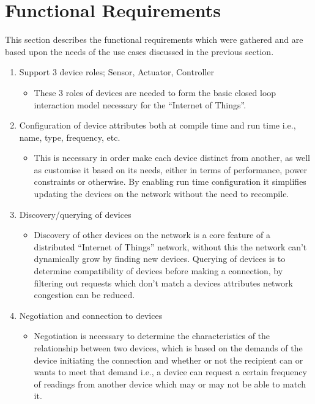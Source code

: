 \section{Functional Requirements} %
\label{sec:functional_requirements}
This section describes the functional requirements which were gathered and are based upon the needs of the use cases discussed in the previous section.
\begin{enumerate}
	\item Support 3 device roles; Sensor, Actuator, Controller
	\begin{itemize}
		\item These 3 roles of devices are needed to form the basic closed loop interaction model necessary for the ``Internet of Things''.
	\end{itemize}
	\item Configuration of device attributes both at compile time and run time i.e., name, type, frequency, etc.
	\begin{itemize}
		\item This is necessary in order make each device distinct from another, as well as customise it based on its needs, either in terms of performance, power constraints or otherwise. By enabling run time configuration it simplifies updating the devices on the network without the need to recompile.
	\end{itemize}
	\item Discovery/querying of devices
	\begin{itemize}
		\item Discovery of other devices on the network is a core feature of a distributed ``Internet of Things'' network, without this the network can't dynamically grow by finding new devices. Querying of devices is to determine compatibility of devices before making a connection, by filtering out requests which don't match a devices attributes network congestion can be reduced.
	\end{itemize}
	\item Negotiation and connection to devices
	\begin{itemize}
		\item Negotiation is necessary to determine the characteristics of the relationship between two devices, which is based on the demands of the device initiating the connection and whether or not the recipient can or wants to meet that demand i.e., a device can request a certain frequency of readings from another device which may or may not be able to match it.

\end{itemize}
\end{enumerate}
